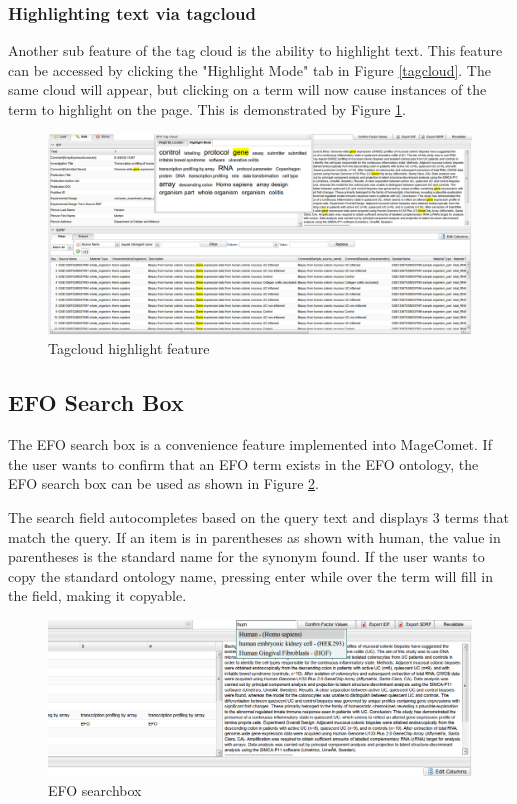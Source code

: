 \documentclass[a4paper]{article}
\begin{document}
\subsubsection{Highlighting text via tagcloud}
Another sub feature of the tag cloud is the ability to highlight text. This feature can be accessed by clicking the "Highlight Mode" tab in Figure \ref{tagcloud}. The same cloud will appear, but clicking on a term will now cause instances of the term to highlight on the page. This is demonstrated by Figure \ref{highlight}.

\begin{figure}[h]
\caption{Tagcloud highlight feature}
\centering
\label{highlight}
\includegraphics[width=17cm]{images/highlight}
\end{figure}

\newpage
\subsection{EFO Search Box}
The EFO search box is a convenience feature implemented into MageComet. If the user wants to confirm that an EFO term exists in the EFO ontology, the EFO search box can be used as shown in Figure \ref{searchbox}.

The search field autocompletes based on the query text and displays 3 terms that match the query. If an item is in parentheses as shown with human, the value in parentheses is the standard name for the synonym found. If the user wants to copy the standard ontology name, pressing enter while over the term will fill in the field, making it copyable.

\begin{figure}[h]
\caption{EFO searchbox}
\centering
\label{searchbox}
\includegraphics[width=17cm]{images/searchbox}
\end{figure}
\end{document}
